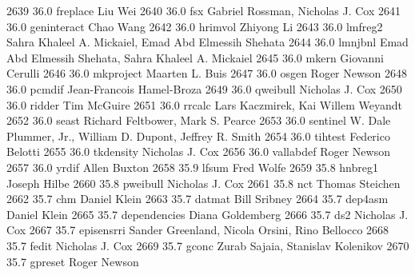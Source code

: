   2639     36.0    freplace      Liu Wei                                 
  2640     36.0    fsx           Gabriel Rossman, Nicholas J. Cox        
  2641     36.0    geninteract   Chao Wang                               
  2642     36.0    hrimvol       Zhiyong Li                              
  2643     36.0    lmfreg2       Sahra Khaleel A. Mickaiel, Emad Abd     
                                   Elmessih Shehata                        
  2644     36.0    lmnjbnl       Emad Abd Elmessih Shehata, Sahra        
                                   Khaleel A. Mickaiel                     
  2645     36.0    mkern         Giovanni Cerulli                        
  2646     36.0    mkproject     Maarten L. Buis                         
  2647     36.0    osgen         Roger Newson                            
  2648     36.0    pcmdif        Jean-Francois Hamel-Broza               
  2649     36.0    qweibull      Nicholas J. Cox                         
  2650     36.0    ridder        Tim McGuire                             
  2651     36.0    rrcalc        Lars Kaczmirek, Kai Willem Weyandt      
  2652     36.0    seast         Richard Feltbower, Mark S. Pearce       
  2653     36.0    sentinel      W. Dale Plummer, Jr., William D.        
                                   Dupont, Jeffrey R. Smith                
  2654     36.0    tihtest       Federico Belotti                        
  2655     36.0    tkdensity     Nicholas J. Cox                         
  2656     36.0    vallabdef     Roger Newson                            
  2657     36.0    yrdif         Allen Buxton                            
  2658     35.9    lfsum         Fred Wolfe                              
  2659     35.8    hnbreg1       Joseph Hilbe                            
  2660     35.8    pweibull      Nicholas J. Cox                         
  2661     35.8    nct           Thomas Steichen                         
  2662     35.7    chm           Daniel Klein                            
  2663     35.7    datmat        Bill Sribney                            
  2664     35.7    dep4asm       Daniel Klein                            
  2665     35.7    dependencies  Diana Goldemberg                        
  2666     35.7    ds2           Nicholas J. Cox                         
  2667     35.7    episensrri    Sander Greenland, Nicola Orsini, Rino   
                                   Bellocco                                
  2668     35.7    fedit         Nicholas J. Cox                         
  2669     35.7    gconc         Zurab Sajaia, Stanislav Kolenikov       
  2670     35.7    gpreset       Roger Newson                            
